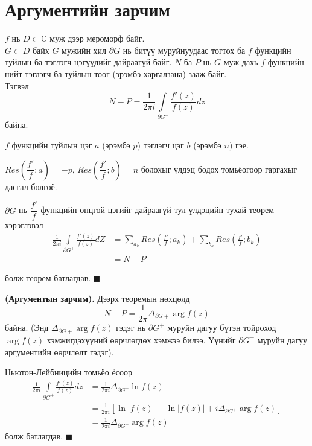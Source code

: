 \section{Аргументийн зарчим} 
\begin{thm}
$f$ нь $D\subset \mathbb{C}$ муж дээр мероморф байг. \\
$\overline{G}\subset D$ байх $G$ мужийн хил $\partial G$ нь битүү муруйнуудаас тогтох ба $f$ функцийн туйлын ба тэглэгч цэгүүдийг дайраагүй байг.
$N$ ба $P$ нь $G$ муж дахь $f$ функцийн нийт тэглэгч ба туйлын тоог (эрэмбэ харгалзана) зааж байг.\\
Тэгвэл 
$$N-P=\frac{1}{2\pi i}\int\limits_{\partial G^+}\frac{f'(z)}{f(z)}dz$$
байна.
\end{thm}
\begin{prf}
$f$ функцийн туйлын цэг $a$ (эрэмбэ $p$) тэглэгч цэг $b$ (эрэмбэ $n)$ гэе. 

$Res \left(\dfrac{f'}{f}; a\right)=-p$, $Res \left(\dfrac{f'}{f}; b\right)=n$
болохыг үлдэц бодох томьёогоор гаргахыг дасгал болгоё.

$\partial G$ нь $\dfrac{f'}{f}$ функцийн онцгой цэгийг дайраагүй тул үлдэцийн тухай теорем хэрэглэвэл 
\begin{align*}
    \frac{1}{2\pi i}\int\limits_{\partial G^+}\frac{f'(z)}{f(z)}dZ&=\sum\limits_{a_k} Res\left(\frac{f'}{f}; a_k\right) +\sum\limits_{b_k}Res \left(\frac{f'}{f};b_k\right) \\
    &=N-P
\end{align*}

болж теорем батлагдав. 
\hfill $\blacksquare$\end{prf}
\begin{cor}
\textbf{(Аргументын зарчим). } Дээрх теоремын нөхцөлд
$$N-P=\frac{1}{2\pi}\Delta_{\partial G+}\arg f(z)$$
байна. (Энд $\Delta_{\partial G+}\arg f(z)$ гэдэг нь $\partial G^+$ муруйн дагуу бүтэн тойроход $\arg f(z)$ хэмжигдэхүүний өөрчлөгдөх хэмжээ билээ. Үүнийг $\partial G^+$ муруйн дагуу аргументийн өөрчлөлт гэдэг).
\end{cor}
\begin{prf}
Ньютон-Лейбницийн томьёо ёсоор
\begin{align*}
    \frac{1}{2\pi i}\int\limits_{\partial G^+}\frac{f'(z)}{f(z)}dz&=\frac{1}{2\pi i}\Delta_{\partial G^+}\ln f(z)\\
    &=\frac{1}{2\pi i}[\ln |f(z)|-\ln |f(z)|+i\Delta_{\partial G^+}\arg f(z)]\\
    &=\frac{1}{2\pi i}\Delta_{\partial G^+}\arg f(z)
\end{align*} болж батлагдав. 
\hfill $\blacksquare$\end{prf}
